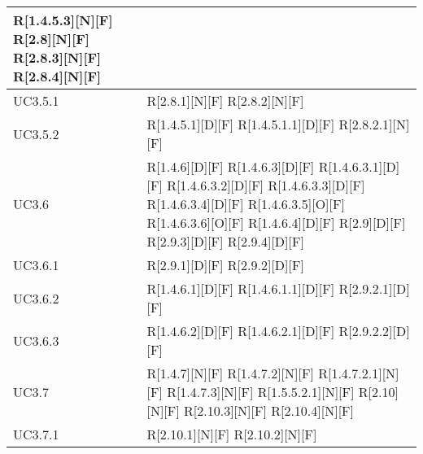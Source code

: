 \begin{longtable}{X | X}
R[1.4.5.3][N][F] \newline
R[2.8][N][F] \newline
R[2.8.3][N][F] \newline
R[2.8.4][N][F]  \\
\hline
UC3.5.1 & R[2.8.1][N][F] \newline
R[2.8.2][N][F]  \\
\hline
UC3.5.2 & R[1.4.5.1][D][F] \newline
R[1.4.5.1.1][D][F] \newline
R[2.8.2.1][N][F]  \\
\hline
UC3.6 & R[1.4.6][D][F] \newline
R[1.4.6.3][D][F] \newline
R[1.4.6.3.1][D][F] \newline
R[1.4.6.3.2][D][F] \newline
R[1.4.6.3.3][D][F] \newline
R[1.4.6.3.4][D][F] \newline
R[1.4.6.3.5][O][F] \newline
R[1.4.6.3.6][O][F] \newline
R[1.4.6.4][D][F] \newline
R[2.9][D][F] \newline
R[2.9.3][D][F] \newline
R[2.9.4][D][F]  \\
\hline
UC3.6.1 & R[2.9.1][D][F] \newline
R[2.9.2][D][F]  \\
\hline
UC3.6.2 & R[1.4.6.1][D][F] \newline
R[1.4.6.1.1][D][F] \newline
R[2.9.2.1][D][F]  \\
\hline
UC3.6.3 & R[1.4.6.2][D][F] \newline
R[1.4.6.2.1][D][F] \newline
R[2.9.2.2][D][F]  \\
\hline
UC3.7 & R[1.4.7][N][F] \newline
R[1.4.7.2][N][F] \newline
R[1.4.7.2.1][N][F] \newline
R[1.4.7.3][N][F] \newline
R[1.5.5.2.1][N][F] \newline
R[2.10][N][F] \newline
R[2.10.3][N][F] \newline
R[2.10.4][N][F]  \\
\hline
UC3.7.1 & R[2.10.1][N][F] \newline
R[2.10.2][N][F]  \\

\end{longtable}
